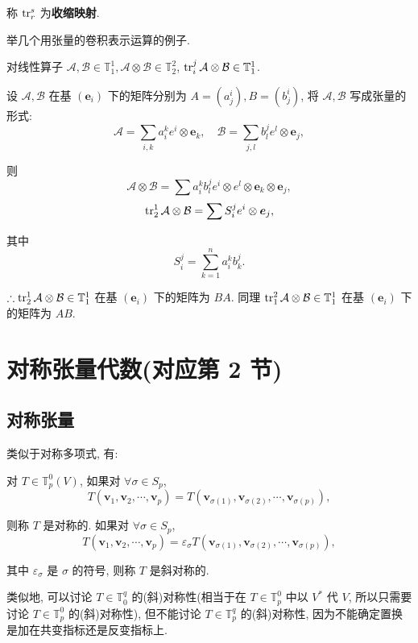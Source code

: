 \documentclass[color=black,device=normal,lang=cn,mode=geye]{elegantnote}
\begin{document}
称 $\operatorname{tr} _r^s$ 为\textbf{收缩映射}.

举几个用张量的卷积表示运算的例子.
\begin{example}
    对线性算子 $\mathcal{A},\mathcal{B}\in\mathbb{T}_1^1,\mathcal{A}\otimes\mathcal{B}\in\mathbb{T}_2^2$, $\operatorname{tr} _i^j\mathcal{A}\otimes\mathcal{B}\in\mathbb{T}_1^1$.

    设 $\mathcal{A},\mathcal{B}$ 在基 $(\boldsymbol{e}_i)$ 下的矩阵分别为 $A=(a_j^i),B=(b_j^i)$, 将 $\mathcal{A},\mathcal{B}$ 写成张量的形式:
    \[\mathcal{A}=\sum\limits_{i,k}a_i^ke^i\otimes\boldsymbol{e}_k,\quad\mathcal{B}=\sum\limits_{j,l}b_l^je^l\otimes\boldsymbol{e}_j,\]

    则
    \[\mathcal{A}\otimes\mathcal{B}=\sum a_i^kb_l^je^i\otimes e^l\otimes\boldsymbol{e}_k\otimes\boldsymbol{e}_j,\]
    \[\operatorname{tr} _2^1\mathcal{A}\otimes\mathcal{B}=\sum S_i^je^i\otimes\boldsymbol{e}_j,\]

    其中
    \[S_i^j=\sum\limits_{k=1}^na_i^kb_k^j.\]

    $\therefore\operatorname{tr} _2^1\mathcal{A}\otimes\mathcal{B}\in\mathbb{T}_1^1$ 在基 $(\boldsymbol{e}_i)$ 下的矩阵为 $BA$. 同理 $\operatorname{tr} _1^2\mathcal{A}\otimes\mathcal{B}\in\mathbb{T}_1^1$ 在基 $(\boldsymbol{e}_i)$ 下的矩阵为 $AB$.
\end{example}
\section{对称张量代数(对应第 2 节)}
\subsection{对称张量}
类似于对称多项式, 有:
\begin{definition}
    对 $T\in\mathbb{T}_p^0(V)$, 如果对 $\forall\sigma\in S_p$,
    \[T(\boldsymbol{v}_1,\boldsymbol{v}_2,\cdots,\boldsymbol{v}_p)=T(\boldsymbol{v}_{\sigma(1)},\boldsymbol{v}_{\sigma(2)},\cdots,\boldsymbol{v}_{\sigma(p)}),\]

    则称 $T$ 是对称的. 如果对 $\forall\sigma\in S_p$,
    \[T(\boldsymbol{v}_1,\boldsymbol{v}_2,\cdots,\boldsymbol{v}_p)=\varepsilon_\sigma T(\boldsymbol{v}_{\sigma(1)},\boldsymbol{v}_{\sigma(2)},\cdots,\boldsymbol{v}_{\sigma(p)}),\]

    其中 $\varepsilon_\sigma$ 是 $\sigma$ 的符号, 则称 $T$ 是斜对称的.
\end{definition}

类似地, 可以讨论 $T\in\mathbb{T}^q_0$ 的(斜)对称性(相当于在 $T\in\mathbb{T}_p^0$ 中以 $V^*$ 代 $V$, 所以只需要讨论 $T\in\mathbb{T}^0_p$ 的(斜)对称性), 但不能讨论 $T\in\mathbb{T}^q_p$ 的(斜)对称性, 因为不能确定置换是加在共变指标还是反变指标上.
\end{document}
